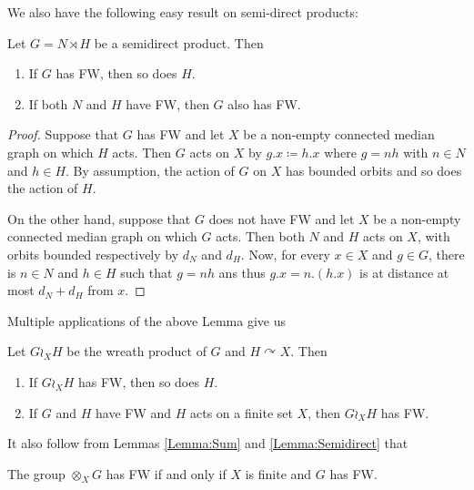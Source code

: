 We also have the following easy result on semi-direct products:
\begin{lem}\label{Lemma:Semidirect}
Let $G=N\rtimes H$ be a semidirect product. Then
\begin{enumerate}
\item
If $G$ has FW, then so does $H$.
\item
If both $N$ and $H$ have FW, then $G$ also has FW.
\end{enumerate}
\end{lem}
\begin{proof}
Suppose that $G$ has FW and let $X$ be a non-empty connected median graph on which $H$ acts.
Then $G$ acts on $X$ by $g.x\coloneqq h.x$ where $g=nh$ with $n\in N$ and $h\in H$.
By assumption, the action of $G$ on $X$ has bounded orbits and so does the action of $H$.

On the other hand, suppose that $G$ does not have FW and let $X$ be a non-empty connected median graph on which $G$ acts.
Then both $N$ and $H$ acts on $X$, with orbits bounded respectively by $d_N$ and $d_H$.
Now, for every $x\in X$ and $g\in G$, there is $n\in N$ and $h\in H$ such that $g=nh$ ans thus $g.x=n.(h.x)$ is at distance at most $d_N+d_H$ from $x$.
\end{proof}
Multiple applications of the above Lemma give us
\begin{cor}\label{Cor:Wreath}
Let $G\wr_X H$ be the wreath product of $G$ and $H\curvearrowright X$.
Then
\begin{enumerate}
\item
If $G\wr_X H$ has FW, then so does $H$.
\item
If $G$ and $H$ have FW and $H$ acts on a finite set $X$, then $G\wr_X H$ has FW.
\end{enumerate}
\end{cor}


It also follow from Lemmas \ref{Lemma:Sum} and \ref{Lemma:Semidirect} that
\begin{cor}
The group $\otimes_X G$ has FW if and only if $X$ is finite and $G$ has FW.
\end{cor}

